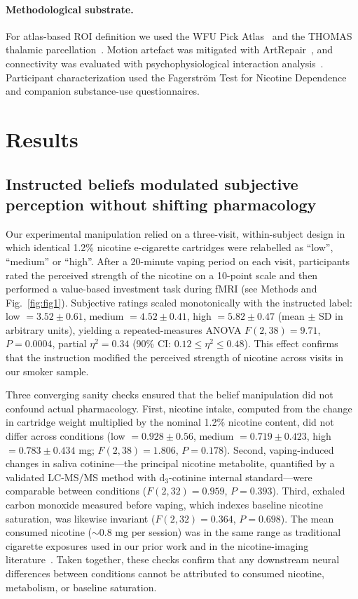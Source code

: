 \documentclass[11pt]{article}
\begin{document}
\paragraph{Methodological substrate.} For atlas-based ROI definition we used the WFU Pick Atlas~\cite{maldjian2003automated} and the THOMAS thalamic parcellation~\cite{mcleod2017spatially}. Motion artefact was mitigated with ArtRepair~\cite{mazaika2009artifact}, and connectivity was evaluated with psychophysiological interaction analysis~\cite{friston1997psychophysiological}. Participant characterization used the Fagerstr\"{o}m Test for Nicotine Dependence~\cite{fagerstrom1991measuring} and companion substance-use questionnaires.

\section{Results}

\subsection{Instructed beliefs modulated subjective perception without shifting pharmacology}

Our experimental manipulation relied on a three-visit, within-subject design in which identical 1.2\% nicotine e-cigarette cartridges were relabelled as ``low'', ``medium'' or ``high''. After a 20-minute vaping period on each visit, participants rated the perceived strength of the nicotine on a 10-point scale and then performed a value-based investment task during fMRI (see Methods and Fig.~\ref{fig:fig1}). Subjective ratings scaled monotonically with the instructed label: low $=3.52 \pm 0.61$, medium $=4.52 \pm 0.41$, high $=5.82 \pm 0.47$ (mean $\pm$ SD in arbitrary units), yielding a repeated-measures ANOVA $F(2,38)=9.71$, $P=0.0004$, partial $\eta^2=0.34$ (90\% CI: $0.12 \leq \eta^2 \leq 0.48$). This effect confirms that the instruction modified the perceived strength of nicotine across visits in our smoker sample.

Three converging sanity checks ensured that the belief manipulation did not confound actual pharmacology. First, nicotine intake, computed from the change in cartridge weight multiplied by the nominal 1.2\% nicotine content, did not differ across conditions (low $=0.928 \pm 0.56$, medium $=0.719 \pm 0.423$, high $=0.783 \pm 0.434$ mg; $F(2,38)=1.806$, $P=0.178$). Second, vaping-induced changes in saliva cotinine---the principal nicotine metabolite, quantified by a validated LC-MS/MS method with d$_3$-cotinine internal standard---were comparable between conditions ($F(2,32)=0.959$, $P=0.393$). Third, exhaled carbon monoxide measured before vaping, which indexes baseline nicotine saturation, was likewise invariant ($F(2,32)=0.364$, $P=0.698$). The mean consumed nicotine ($\sim0.8$ mg per session) was in the same range as traditional cigarette exposures used in our prior work and in the nicotine-imaging literature~\cite{brody2006cigarette,gu2015belief}. Taken together, these checks confirm that any downstream neural differences between conditions cannot be attributed to consumed nicotine, metabolism, or baseline saturation.
\end{document}
